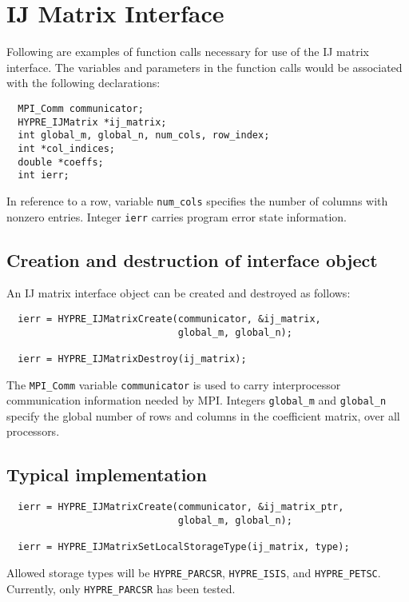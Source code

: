 \section{IJ Matrix Interface}

Following are examples of function calls necessary for use of the
IJ matrix interface.  The variables and parameters in the
function calls would be associated with the following declarations:

\begin{verbatim}
  MPI_Comm communicator;
  HYPRE_IJMatrix *ij_matrix;
  int global_m, global_n, num_cols, row_index;
  int *col_indices;
  double *coeffs;
  int ierr;
\end{verbatim}

\noindent In reference to a row, variable \verb+num_cols+ specifies
the number of columns with nonzero entries.
Integer \verb+ierr+ carries program error state information. 

\subsection{Creation and destruction of interface object}

An IJ matrix interface object can be created and destroyed as
follows:
\begin{verbatim}
  ierr = HYPRE_IJMatrixCreate(communicator, &ij_matrix,
                              global_m, global_n);

  ierr = HYPRE_IJMatrixDestroy(ij_matrix);
\end{verbatim}
\noindent The \verb+MPI_Comm+ variable \verb+communicator+
is used to carry
interprocessor communication information needed by MPI.
Integers \verb+global_m+ and \verb+global_n+ specify the global
number of rows and columns in the coefficient matrix, over all processors.

\subsection{Typical implementation}

\begin{verbatim}
  ierr = HYPRE_IJMatrixCreate(communicator, &ij_matrix_ptr,
                              global_m, global_n);

  ierr = HYPRE_IJMatrixSetLocalStorageType(ij_matrix, type);
\end{verbatim}

\noindent Allowed storage types will be \verb+HYPRE_PARCSR+,
\verb+HYPRE_ISIS+, and \verb+HYPRE_PETSC+.  Currently, only
\verb+HYPRE_PARCSR+ has been tested. 

